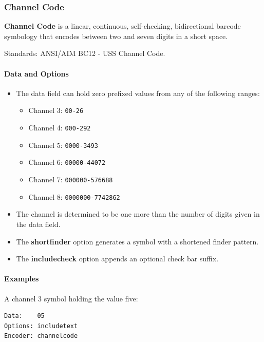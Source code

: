 \hypertarget{channel-code}{%
\subsubsection{Channel Code}\label{channel-code}}

\textbf{Channel Code} is a linear, continuous, self-checking,
bidirectional barcode symbology that encodes between two and seven
digits in a short space.

Standards: ANSI/AIM BC12 - USS Channel Code.

\hypertarget{data-and-options-60}{%
\paragraph{Data and Options}\label{data-and-options-60}}

\begin{itemize}
\tightlist
\item
  The data field can hold zero prefixed values from any of the following
  ranges:

  \begin{itemize}
  \tightlist
  \item
    Channel 3: \texttt{00-26}
  \item
    Channel 4: \texttt{000-292}
  \item
    Channel 5: \texttt{0000-3493}
  \item
    Channel 6: \texttt{00000-44072}
  \item
    Channel 7: \texttt{000000-576688}
  \item
    Channel 8: \texttt{0000000-7742862}
  \end{itemize}
\item
  The channel is determined to be one more than the number of digits
  given in the data field.
\item
  The \textbf{shortfinder} option generates a symbol with a shortened
  finder pattern.
\item
  The \textbf{includecheck} option appends an optional check bar suffix.
\end{itemize}

\hypertarget{examples-39}{%
\paragraph{Examples}\label{examples-39}}

A channel 3 symbol holding the value five:

\begin{verbatim}
Data:    05
Options: includetext
Encoder: channelcode
\end{verbatim}

